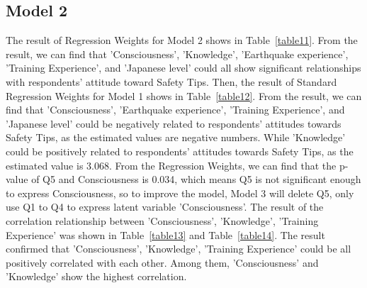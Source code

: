 
\subsection{Model 2}

The result of Regression Weights for Model 2 shows in Table~\ref{table11}. From the result, we can find that 'Consciousness', 'Knowledge', 'Earthquake experience', 'Training Experience', and 'Japanese level' could all show significant relationships with respondents' attitude toward Safety Tips. Then, the result of Standard Regression Weights for Model 1 shows in Table~\ref{table12}. From the result, we can find that 'Consciousness', 'Earthquake experience', 'Training Experience', and 'Japanese level' could be negatively related to respondents' attitudes towards Safety Tips, as the estimated values are negative numbers. While 'Knowledge' could be positively related to respondents' attitudes towards Safety Tips, as the estimated value is 3.068. From the  Regression Weights, we can find that the p-value of Q5 and Consciousness is 0.034, which means Q5 is not significant enough to express Consciousness, so to improve the model, Model 3 will delete Q5, only use Q1 to Q4 to express latent variable 'Consciousness'. The result of the correlation relationship between 'Consciousness', 'Knowledge', 'Training Experience' was shown in Table~\ref{table13} and Table~\ref{table14}. The result confirmed that 'Consciousness', 'Knowledge', 'Training Experience' could be all positively correlated with each other. Among them, 'Consciousness' and 'Knowledge' show the highest correlation. 

